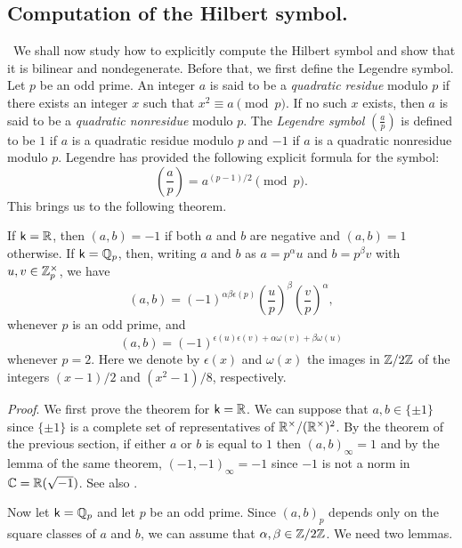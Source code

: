 \subsection{Computation of the Hilbert symbol.}~We shall now study how to
explicitly compute the Hilbert symbol and show that it is bilinear and
nondegenerate. Before that, we first define the {Legendre symbol}. Let \(p\) be
an odd prime. An integer \(a\) is said to be a \emph{quadratic residue} modulo
\(p\) if there exists an integer \(x\) such that \(x^2 \equiv a \pmod{p}\). If
no such \(x\) exists, then \(a\) is said to be a \emph{quadratic nonresidue}
modulo \(p\). The \emph{Legendre symbol} \(\left(\frac{a}{p}\right)\) is defined
to be \(1\) if \(a\) is a quadratic residue modulo \(p\) and \(-1\) if \(a\) is
a quadratic nonresidue modulo \(p\). Legendre has provided the following
explicit formula for the symbol:\label{sec:computing-hilbert-symbol}
\[
       \left(\frac{a}{p}\right) = a^{(p-1)/2} \pmod{p}.  
\]
This brings us to the following theorem.
\begin{theorem}
    {\normalfont\cite[pp.~20--21]{serre2012course}} If \(\mathsf{k} = \mathbb{R}\), then
    \((a, b) = -1\) if both \(a\) and \(b\) are negative and \((a, b) = 1\)
    otherwise. If \(\mathsf{k} = \mathbb{Q}_p\), then, writing \(a\) and \(b\) as
    \(a = p^\alpha u\) and \(b = p^\beta v\) with \(u, v \in \mathbb{Z}_p^{\times}\), we have
    \[
        (a, b) = (-1)^{\alpha\beta\epsilon(p)}\left(\frac{u}{p}\right)^{\beta}\left(\frac{v}{p}\right)^{\alpha},
    \]
    whenever \(p\) is an odd prime, and 
    \[
        (a, b) = (-1)^{\epsilon(u)\epsilon(v) + \alpha\omega(v) + \beta\omega(u)}
    \]
    whenever \(p = 2\). Here we denote by \(\epsilon(x)\) and \(\omega(x)\) the
    images in \(\mathbb{Z}/2\mathbb{Z}\) of the integers \((x-1)/2\) and
    \((x^2-1)/8\), respectively.
\end{theorem}

\emph{Proof}. We first prove the theorem for \(\mathsf{k} = \mathbb{R}\). We can suppose
that \(a, b \in \{\pm 1\}\) since \(\{\pm 1\}\) is a complete set of
representatives of \(\mathbb{R}^{\times}/(\mathbb{R}^{\times})^2\). By the theorem of
the previous section, if either \(a\) or \(b\) is equal to \(1\) then \((a,
b)_{\infty} = 1\) and by the lemma of the same theorem, \((-1, -1)_{\infty} =
-1\) since \(-1\) is not a norm in \(\mathbb{C} = \mathbb{R}(\sqrt{-1})\). See also
\cite[Theorem~10.4]{sutherland2013introduction10}.

Now let \(\mathsf{k} = \mathbb{Q}_p\) and let \(p\) be an odd prime. Since \((a,
b)_p\) depends only on the square classes of \(a\) and \(b\), we can assume that
\(\alpha, \beta \in \mathbb{Z}/ 2\mathbb{Z}\). We need two lemmas.

